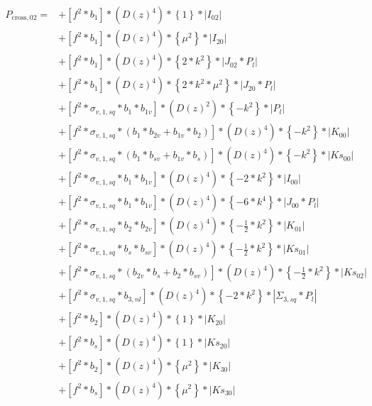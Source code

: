 \documentclass{article}
\begin{document}
\begin{equation}
\begin{aligned} 
P_{\mathrm{cross},02}=
&+\left[f^{2}*b_{1}\right]*\left(D(z)^{4}\right)*\left\{1\right\}*\left|I_{02}\right| \\
&+\left[f^{2}*b_{1}\right]*\left(D(z)^{4}\right)*\left\{\mu^{2}\right\}*\left|I_{20}\right| \\
&+\left[f^{2}*b_{1}\right]*\left(D(z)^{4}\right)*\left\{2*k^{2}\right\}*\left|J_{02}*P_l\right| \\
&+\left[f^{2}*b_{1}\right]*\left(D(z)^{4}\right)*\left\{2*k^{2}*\mu^{2}\right\}*\left|J_{20}*P_l\right| \\
&+\left[f^{2}*\sigma_{v,1,sq}*b_{1}*b_{1v}\right]*\left(D(z)^{2}\right)*\left\{-k^{2}\right\}*\left|P_l\right| \\
&+\left[f^{2}*\sigma_{v,1,sq}*(b_{1}*b_{2v} + b_{1v}*b_{2})\right]*\left(D(z)^{4}\right)*\left\{-k^{2}\right\}*\left|K_{00}\right| \\
&+\left[f^{2}*\sigma_{v,1,sq}*(b_{1}*b_{sv} + b_{1v}*b_{s})\right]*\left(D(z)^{4}\right)*\left\{-k^{2}\right\}*\left|Ks_{00}\right| \\
&+\left[f^{2}*\sigma_{v,1,sq}*b_{1}*b_{1v}\right]*\left(D(z)^{4}\right)*\left\{-2*k^{2}\right\}*\left|I_{00}\right| \\
&+\left[f^{2}*\sigma_{v,1,sq}*b_{1}*b_{1v}\right]*\left(D(z)^{4}\right)*\left\{-6*k^{4}\right\}*\left|J_{00}*P_l\right| \\
&+\left[f^{2}*\sigma_{v,1,sq}*b_{2}*b_{2v}\right]*\left(D(z)^{4}\right)*\left\{-\frac{1}{2}*k^{2}\right\}*\left|K_{01}\right| \\
&+\left[f^{2}*\sigma_{v,1,sq}*b_{s}*b_{sv}\right]*\left(D(z)^{4}\right)*\left\{-\frac{1}{2}*k^{2}\right\}*\left|Ks_{01}\right| \\
&+\left[f^{2}*\sigma_{v,1,sq}*(b_{2v}*b_{s} + b_{2}*b_{sv})\right]*\left(D(z)^{4}\right)*\left\{-\frac{1}{2}*k^{2}\right\}*\left|Ks_{02}\right| \\
&+\left[f^{2}*\sigma_{v,1,sq}*b_{3,nl}\right]*\left(D(z)^{4}\right)*\left\{-2*k^{2}\right\}*\left|\Sigma_{3,sq}*P_l\right| \\
&+\left[f^{2}*b_{2}\right]*\left(D(z)^{4}\right)*\left\{1\right\}*\left|K_{20}\right| \\
&+\left[f^{2}*b_{s}\right]*\left(D(z)^{4}\right)*\left\{1\right\}*\left|Ks_{20}\right| \\
&+\left[f^{2}*b_{2}\right]*\left(D(z)^{4}\right)*\left\{\mu^{2}\right\}*\left|K_{30}\right| \\
&+\left[f^{2}*b_{s}\right]*\left(D(z)^{4}\right)*\left\{\mu^{2}\right\}*\left|Ks_{30}\right| \\
\end{aligned}
\end{equation}
\end{document}
